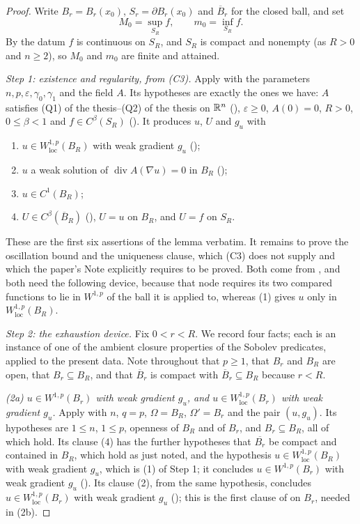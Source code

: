 \begin{proof}
Write $B_r=B_r(x_0)$, $S_r=\partial B_r(x_0)$ and $\overline B_r$ for the closed
ball, and set
\[
M_0=\sup_{S_R}f,\qquad m_0=\inf_{S_R}f .
\]
By  the datum $f$ is continuous on $S_R$, and $S_R$ is
compact and nonempty (as $R>0$ and $n\ge2$), so $M_0$ and $m_0$ are finite and
attained.

\emph{Step 1: existence and regularity, from (C3).}  Apply
 with the parameters $n,p,\varepsilon,\gamma_0,
\gamma_1$ and the field $A$.  Its hypotheses are exactly the ones we have:
$A$ satisfies (Q1) of the thesis--(Q2) of the thesis on $\mathbb{R}^n$
(), $\varepsilon\ge0$, $A(0)=0$, $R>0$,
$0\le\beta<1$ and $f\in C^\beta(S_R)$ ().  It produces
$u$, $U$ and $g_u$ with
\begin{enumerate}
\item $u\in W^{1,p}_{\mathrm{loc}}(B_R)$ with weak gradient $g_u$
  ();
\item $u$ a weak solution of $\operatorname{div}A(\nabla u)=0$ in $B_R$
  ();
\item $u\in C^1(B_R)$;
\item $U\in C^\beta(\overline B_R)$ (), $U=u$ on $B_R$, and
  $U=f$ on $S_R$.
\end{enumerate}
These are the first six assertions of the lemma verbatim.  It remains to prove
the oscillation bound and the uniqueness clause, which (C3) does not supply and
which the paper's Note explicitly requires to be proved.  Both come from
, and both need the following device, because
that node requires its two compared functions to lie in $W^{1,p}$ of the ball it
is applied to, whereas (1) gives $u$ only in $W^{1,p}_{\mathrm{loc}}(B_R)$.

\emph{Step 2: the exhaustion device.}  Fix $0<r<R$.  We record four facts; each
is an instance of one of the ambient closure properties of the Sobolev
predicates, applied to the present data.  Note throughout that $p\ge1$, that
$B_r$ and $B_R$ are open, that $B_r\subseteq B_R$, and that
$\overline B_r$ is compact with $\overline B_r\subseteq B_R$ because $r<R$.

\emph{(2a) $u\in W^{1,p}(B_r)$ with weak gradient $g_u$, and
$u\in W^{1,p}_{\mathrm{loc}}(B_r)$ with weak gradient $g_u$.}  Apply
 with $n$, $q=p$, $\Omega=B_R$, $\Omega'=B_r$ and
the pair $(u,g_u)$.  Its hypotheses are $1\le n$, $1\le p$, openness of $B_R$
and of $B_r$, and $B_r\subseteq B_R$, all of which hold.  Its clause (4) has the
further hypotheses that $\overline{B_r}$ be compact and contained in $B_R$,
which hold as just noted, and the hypothesis
$u\in W^{1,p}_{\mathrm{loc}}(B_R)$ with weak gradient $g_u$, which is (1) of
Step 1; it concludes $u\in W^{1,p}(B_r)$ with weak gradient $g_u$
().  Its clause (2), from the same hypothesis, concludes
$u\in W^{1,p}_{\mathrm{loc}}(B_r)$ with weak gradient $g_u$
(); this is the first clause of
 on $B_r$, needed in (2b).


\end{proof}
